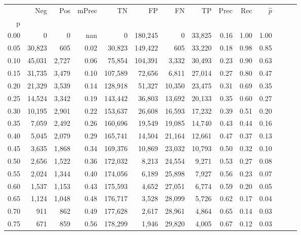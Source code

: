 \begin{tabular}{rrrrrrrrrrrrrr}
\toprule
{} &     Neg &    Pos & mPrec &       TN &       FP &      FN &      TP &  Prec &   Rec & $\hat{p}$ \\
p    &         &        &       &          &          &         &         &       &       &           \\
\midrule
0.00 &       0 &      0 &   nan &        0 &  180,245 &       0 &  33,825 &  0.16 &  1.00 &      1.00 \\
0.05 &  30,823 &    605 &  0.02 &   30,823 &  149,422 &     605 &  33,220 &  0.18 &  0.98 &      0.85 \\
0.10 &  45,031 &  2,727 &  0.06 &   75,854 &  104,391 &   3,332 &  30,493 &  0.23 &  0.90 &      0.63 \\
0.15 &  31,735 &  3,479 &  0.10 &  107,589 &   72,656 &   6,811 &  27,014 &  0.27 &  0.80 &      0.47 \\
0.20 &  21,329 &  3,539 &  0.14 &  128,918 &   51,327 &  10,350 &  23,475 &  0.31 &  0.69 &      0.35 \\
0.25 &  14,524 &  3,342 &  0.19 &  143,442 &   36,803 &  13,692 &  20,133 &  0.35 &  0.60 &      0.27 \\
0.30 &  10,195 &  2,901 &  0.22 &  153,637 &   26,608 &  16,593 &  17,232 &  0.39 &  0.51 &      0.20 \\
0.35 &   7,059 &  2,492 &  0.26 &  160,696 &   19,549 &  19,085 &  14,740 &  0.43 &  0.44 &      0.16 \\
0.40 &   5,045 &  2,079 &  0.29 &  165,741 &   14,504 &  21,164 &  12,661 &  0.47 &  0.37 &      0.13 \\
0.45 &   3,635 &  1,868 &  0.34 &  169,376 &   10,869 &  23,032 &  10,793 &  0.50 &  0.32 &      0.10 \\
0.50 &   2,656 &  1,522 &  0.36 &  172,032 &    8,213 &  24,554 &   9,271 &  0.53 &  0.27 &      0.08 \\
0.55 &   2,024 &  1,344 &  0.40 &  174,056 &    6,189 &  25,898 &   7,927 &  0.56 &  0.23 &      0.07 \\
0.60 &   1,537 &  1,153 &  0.43 &  175,593 &    4,652 &  27,051 &   6,774 &  0.59 &  0.20 &      0.05 \\
0.65 &   1,124 &  1,048 &  0.48 &  176,717 &    3,528 &  28,099 &   5,726 &  0.62 &  0.17 &      0.04 \\
0.70 &     911 &    862 &  0.49 &  177,628 &    2,617 &  28,961 &   4,864 &  0.65 &  0.14 &      0.03 \\
0.75 &     671 &    859 &  0.56 &  178,299 &    1,946 &  29,820 &   4,005 &  0.67 &  0.12 &      0.03 \\

\end{tabular}
